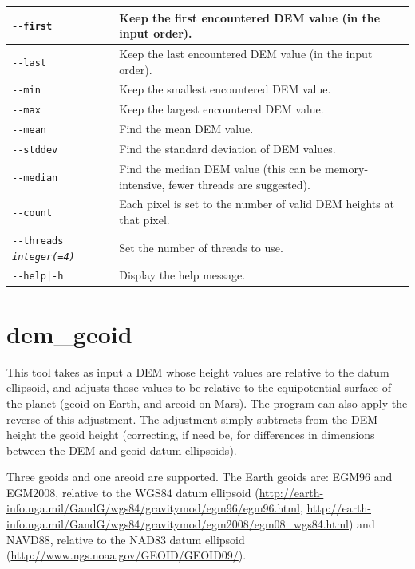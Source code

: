 \begin{longtable}{|l|p{10cm}|}
\texttt{-\/-first}
& Keep the first encountered DEM value (in the input order).
\\ \hline

\texttt{-\/-last}
& Keep the last encountered DEM value (in the input order).
\\ \hline

\texttt{-\/-min}
& Keep the smallest encountered DEM value.
\\ \hline

\texttt{-\/-max}
& Keep the largest encountered DEM value.
\\ \hline

\texttt{-\/-mean}
& Find the mean DEM value.
\\ \hline

\texttt{-\/-stddev}
& Find the standard deviation of DEM values.
\\ \hline

\texttt{-\/-median}
& Find the median DEM value (this can be memory-intensive, fewer threads are suggested).
\\ \hline

\texttt{-\/-count}
& Each pixel is set to the number of valid DEM heights at that pixel.
\\ \hline

\texttt{-\/-threads \textit{integer(=4)}}
& Set the number of threads to use.
\\ \hline
\texttt{-\/-help|-h} & Display the help message.
\\ \hline
\end{longtable}

\clearpage

\section{dem\_geoid}
\label{demgeoid}

This tool takes as input a \ac{DEM} whose height values are relative to the
datum ellipsoid, and adjusts those values to be relative to the
equipotential surface of the planet (geoid on Earth, and areoid on
Mars). The program can also apply the reverse of this adjustment. The
adjustment simply subtracts from the DEM height the geoid height
(correcting, if need be, for differences in dimensions between the DEM
and geoid datum ellipsoids).

Three geoids and one areoid are supported. The Earth geoids are: EGM96
and EGM2008, relative to the WGS84 datum ellipsoid
(\url{http://earth-info.nga.mil/GandG/wgs84/gravitymod/egm96/egm96.html},
\url{http://earth-info.nga.mil/GandG/wgs84/gravitymod/egm2008/egm08_wgs84.html})
and NAVD88, relative to the NAD83 datum ellipsoid
(\url{http://www.ngs.noaa.gov/GEOID/GEOID09/}).

